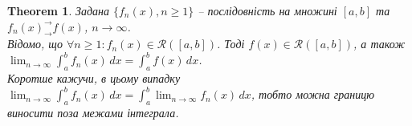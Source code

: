 \documentclass[a4paper, 10pt]{article}
\makeatletter
\def\huge{\displaystyle}
\theoremstyle{theoremdd}
\newtheorem{theorem}{Theorem}[subsection]
\theoremstyle{theoremdd}
\theoremstyle{theoremdd}
\theoremstyle{theoremdd}
\theoremstyle{theoremdd}
\theoremstyle{theoremdd}
\theoremstyle{theoremdd}
\theoremstyle{theoremdd}
\theoremstyle{theoremdd}
\renewenvironment{proof}[1][Proof.\\]{\par
\pushQED{\hfill \qed}%
\normalfont \topsep6\p@\@plus6\p@\relax
\trivlist
\item\relax
{\bfseries
#1\@addpunct{.}}\hspace\labelsep\ignorespaces
}{%
\popQED\endtrivlist\@endpefalse
}
\makeatother
\begin{document}

\begin{theorem}
\label{integration_of_funcitonal_sequence}
Задана $\{f_n(x), n \geq 1\}$ -- послідовність на множині $[a,b]$ та $f_n(x)^\rightarrow_\rightarrow f(x)$, $n \to \infty$.\\
Відомо, що $\forall n \geq 1: f_n(x) \in \mathcal{R}([a,b])$. Тоді $f(x) \in \mathcal{R}([a,b])$, а також $\huge\lim_{n \to \infty} \int_a^b f_n(x)\,dx = \int_a^b f(x)\,dx$.\\
Коротше кажучи, в цьому випадку $\displaystyle\lim_{n \to \infty} \int_a^b f_n(x)\,dx = \int_a^b \lim_{n \to \infty} f_n(x)\,dx$, тобто можна границю виносити поза межами інтеграла.
\end{theorem}
\end{document}
